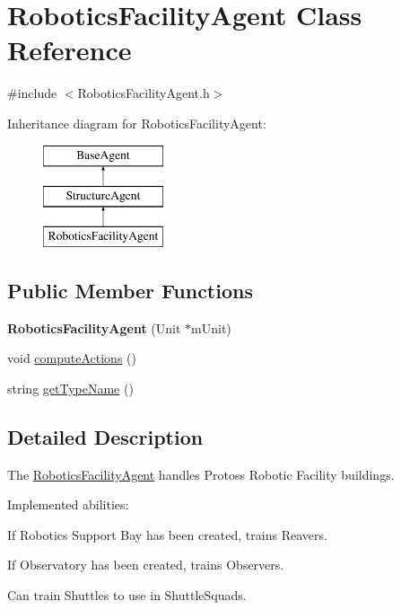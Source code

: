 \hypertarget{class_robotics_facility_agent}{
\section{RoboticsFacilityAgent Class Reference}
\label{class_robotics_facility_agent}
}


{\ttfamily \#include $<$RoboticsFacilityAgent.h$>$}

Inheritance diagram for RoboticsFacilityAgent:\begin{figure}[H]
\begin{center}
\leavevmode
\includegraphics[height=3.000000cm]{class_robotics_facility_agent}
\end{center}
\end{figure}
\subsection*{Public Member Functions}
\begin{DoxyCompactItemize}
\item 
\hypertarget{class_robotics_facility_agent_ad85fe66d8ac216da4c6581891ed95a71}{
{\bfseries RoboticsFacilityAgent} (Unit $\ast$mUnit)}
\label{class_robotics_facility_agent_ad85fe66d8ac216da4c6581891ed95a71}

\item 
void \hyperlink{class_robotics_facility_agent_a1db39577c8065e48646901d4f8e34f7a}{computeActions} ()
\item 
string \hyperlink{class_robotics_facility_agent_a989840053369ee06340523fa58891990}{getTypeName} ()
\end{DoxyCompactItemize}


\subsection{Detailed Description}
The \hyperlink{class_robotics_facility_agent}{RoboticsFacilityAgent} handles Protoss Robotic Facility buildings.

Implemented abilities:
\begin{DoxyItemize}
\item If Robotics Support Bay has been created, trains Reavers.
\item If Observatory has been created, trains Observers.
\item Can train Shuttles to use in ShuttleSquads.
\end{DoxyItemize}

